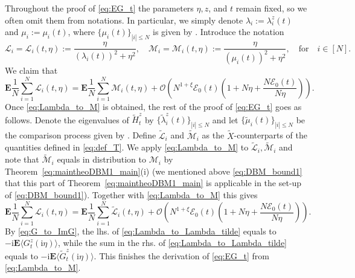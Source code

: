 \documentclass[10pt]{amsart}
\numberwithin{equation}{section}
\newcommand{\E}{\mathbf{E}}
\newcommand{\ii}{\mathrm{i}}
\begin{document}
Throughout the proof of \eqref{eq:EG_t} the parameters $\eta,z$, and $t$ remain fixed, so we often omit them from notations. In particular, we simply denote $\lambda_i:=\lambda_i^z(t)$ and $\mu_i:=\mu_i(t)$, where $\{\mu_i(t)\}_{|i|\le N}$ is given by \cite[Proposition~4.6]{bourgade2024fluctuations}. Introduce the notation
\begin{equation}
\mathscr{L}_i=\mathscr{L}_i(t,\eta):= \frac{\eta}{( \lambda_i(t))^2 +\eta^2},\quad \mathscr{M}_i=\mathscr{M}_i(t,\eta):= \frac{\eta}{(\mu_i(t))^2 +\eta^2},\quad \text{for}\quad i\in [N].
\label{eq:def_T}
\end{equation}
We claim that 
\begin{equation}
\E\frac{1}{N}\sum_{i=1}^N \mathscr{L}_i(t,\eta) = \E\frac{1}{N}\sum_{i=1}^N \mathscr{M}_i(t,\eta) + \mathcal{O}\left(N^{1+\xi}\mathcal{E}_0(t)\left(1+N\eta + \frac{N\mathcal{E}_0(t)}{N\eta}\right)\right).
\label{eq:Lambda_to_M}
\end{equation}
Once \eqref{eq:Lambda_to_M} is obtained, the rest of the proof of \eqref{eq:EG_t} goes as follows. Denote the eigenvalues of $\widetilde{H}^z_t$ by $\{\widetilde{\lambda}_i^z(t)\}_{|i|\le N}$ and let $\{\widetilde{\mu}_i(t)\}_{|i|\le N}$ be the comparison process given by \cite[Proposition~4.6]{bourgade2024fluctuations}. Define $\widetilde{\mathscr{L}}_i$ and $\widetilde{\mathscr{M}}_i$ as the $\widetilde{X}$-counterparts of the quantities defined in \eqref{eq:def_T}. We apply \eqref{eq:Lambda_to_M} to $\widetilde{\mathscr{L}}_i, \widetilde{\mathscr{M}}_i$ and note that $\widetilde{\mathscr{M}}_i$ equals in distribution to $\mathscr{M}_i$ by Theorem~\ref{eq:maintheoDBM1_main}(i) (we mentioned above \eqref{eq:DBM_bound1} that this part of Theorem~\ref{eq:maintheoDBM1_main} is applicable in the set-up of \eqref{eq:DBM_bound1}). Together with \eqref{eq:Lambda_to_M} this gives
\begin{equation}
\E\frac{1}{N}\sum_{i=1}^N \mathscr{L}_i(t,\eta) = \E\frac{1}{N}\sum_{i=1}^N \widetilde{\mathscr{L}}_i(t,\eta)+\mathcal{O}\left(N^{1+\xi}\mathcal{E}_0(t)\left(1+N\eta + \frac{N\mathcal{E}_0(t)}{N\eta}\right)\right).
\label{eq:Lambda_to_Lambda_tilde}
\end{equation}
By \eqref{eq:G_to_ImG}, the lhs. of \eqref{eq:Lambda_to_Lambda_tilde} equals to $-\ii \E\langle G^z_t(\ii\eta)\rangle$, while the sum in the rhs. of \eqref{eq:Lambda_to_Lambda_tilde} equals to $-\ii \E\langle \widetilde{G}^z_t(\ii\eta)\rangle$. This finishes the derivation of \eqref{eq:EG_t} from \eqref{eq:Lambda_to_M}.
\end{document}
